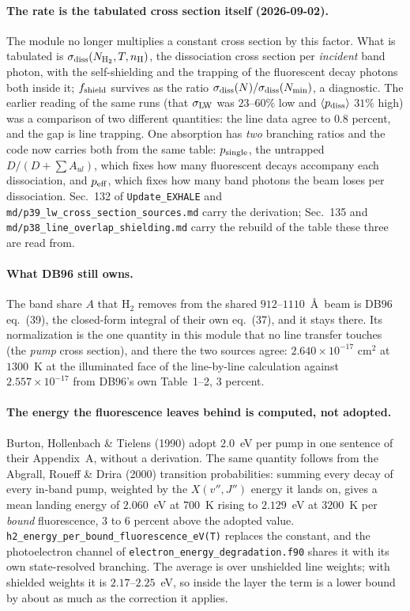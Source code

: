 \documentclass[english,a4paper]{my_memo}
\begin{document}
\paragraph{The rate is the tabulated cross section itself (2026-09-02).} The
module no longer multiplies a constant cross section by this factor. What is
tabulated is $\sigma_{\rm diss}(N_{\rm H_2}, T, n_{\rm H})$, the dissociation
cross section per \emph{incident} band photon, with the self-shielding and the
trapping of the fluorescent decay photons both inside it; $f_{\rm shield}$
survives as the ratio $\sigma_{\rm diss}(N)/\sigma_{\rm diss}(N_{\min})$, a
diagnostic. The earlier reading of the same runs (that $\sigma_{\rm LW}$
was $23$--$60\%$ low and $\langle p_{\rm diss}\rangle$ $31\%$ high) was a
comparison of two different quantities: the line data agree to $0.8$ percent,
and the gap is line trapping. One absorption has \emph{two} branching ratios
and the code now carries both from the same table: $p_{\rm single}$, the
untrapped $D/(D+\sum A_{ul})$, which fixes how many fluorescent decays
accompany each dissociation, and $p_{\rm eff}$, which fixes how many band
photons the beam loses per dissociation. Sec.~132 of \texttt{Update\_EXHALE}
and \texttt{md/p39\_lw\_cross\_section\_sources.md} carry the derivation;
Sec.~135 and \texttt{md/p38\_line\_overlap\_shielding.md} carry the rebuild
of the table these three are read from.

\paragraph{What DB96 still owns.} The band share $A$ that H$_2$ removes from
the shared $912$--$1110$~\AA\ beam is DB96 eq.~(39), the closed-form integral
of their own eq.~(37), and it stays there. Its normalization is the one
quantity in this module that no line transfer touches (the \emph{pump}
cross section), and there the two sources agree: $2.640\times10^{-17}$
cm$^2$ at $1300$~K at the illuminated face of the line-by-line calculation
against $2.557\times10^{-17}$ from DB96's own Table~1--2, $3$ percent.

\paragraph{The energy the fluorescence leaves behind is computed, not
adopted.} Burton, Hollenbach \& Tielens (1990) adopt $2.0$~eV per pump in one
sentence of their Appendix~A, without a derivation. The same quantity follows
from the Abgrall, Roueff \& Drira (2000) transition probabilities: summing
every decay of every in-band pump, weighted by the $X(v'',J'')$ energy it
lands on, gives a mean landing energy of $2.060$~eV at $700$~K rising to
$2.129$~eV at $3200$~K per \emph{bound} fluorescence, $3$ to $6$ percent
above the adopted value. \texttt{h2\_energy\_per\_bound\_fluorescence\_eV(T)}
replaces the constant, and the photoelectron channel of
\texttt{electron\_energy\_degradation.f90} shares it with its own
state-resolved branching. The average is over unshielded line weights; with
shielded weights it is $2.17$--$2.25$~eV, so inside the layer the term is a
lower bound by about as much as the correction it applies.
\end{document}
